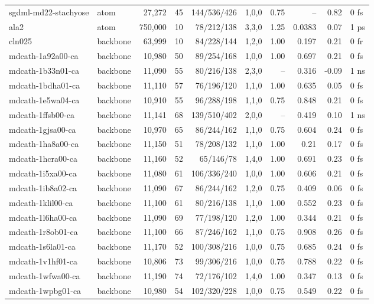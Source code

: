 \begin{small}
\begin{longtable}{llrrrlrrrl}
sgdml-md22-stachyose & atom & 27,272 & 45 & 144/536/426 & 1,0,0 & 0.75 & -- & 0.82 & 0 fs\\
ala2 & atom & 750,000 & 10 & 78/212/138 & 3,3,0 & 1.25 & 0.0383 & 0.07 & 1 ps\\
cln025 & backbone & 63,999 & 10 & 84/228/144 & 1,2,0 & 1.00 & 0.197 & 0.21 & 0 fr\\
mdcath-1a92a00-ca & backbone & 10,980 & 50 & 89/254/168 & 1,0,0 & 1.00 & 0.697 & 0.21 & 0 fs\\
mdcath-1b33n01-ca & backbone & 11,090 & 55 & 80/216/138 & 2,3,0 & -- & 0.316 & -0.09 & 1 ns\\
mdcath-1bdha01-ca & backbone & 11,110 & 57 & 76/196/120 & 1,1,0 & 1.00 & 0.635 & 0.05 & 0 fs\\
mdcath-1e5wa04-ca & backbone & 10,910 & 55 & 96/288/198 & 1,1,0 & 0.75 & 0.848 & 0.21 & 0 fs\\
mdcath-1ffsb00-ca & backbone & 11,141 & 68 & 139/510/402 & 2,0,0 & -- & 0.419 & 0.10 & 1 ns\\
mdcath-1gjsa00-ca & backbone & 10,970 & 65 & 86/244/162 & 1,1,0 & 0.75 & 0.604 & 0.24 & 0 fs\\
mdcath-1ha8a00-ca & backbone & 11,150 & 51 & 78/208/132 & 1,1,0 & 1.00 & 0.21 & 0.17 & 0 fs\\
mdcath-1hcra00-ca & backbone & 11,160 & 52 & 65/146/78 & 1,4,0 & 1.00 & 0.691 & 0.23 & 0 fs\\
mdcath-1i5xa00-ca & backbone & 11,080 & 61 & 106/336/240 & 1,0,0 & 1.00 & 0.606 & 0.21 & 0 fs\\
mdcath-1ib8a02-ca & backbone & 11,090 & 67 & 86/244/162 & 1,2,0 & 0.75 & 0.409 & 0.06 & 0 fs\\
mdcath-1klil00-ca & backbone & 11,100 & 61 & 80/216/138 & 1,1,0 & 1.00 & 0.552 & 0.23 & 0 fs\\
mdcath-1l6ha00-ca & backbone & 11,090 & 69 & 77/198/120 & 1,2,0 & 1.00 & 0.344 & 0.21 & 0 fs\\
mdcath-1r8ob01-ca & backbone & 11,100 & 66 & 87/246/162 & 1,1,0 & 0.75 & 0.908 & 0.26 & 0 fs\\
mdcath-1s6la01-ca & backbone & 11,170 & 52 & 100/308/216 & 1,0,0 & 0.75 & 0.685 & 0.24 & 0 fs\\
mdcath-1v1hf01-ca & backbone & 10,806 & 73 & 99/306/216 & 1,0,0 & 0.75 & 0.788 & 0.22 & 0 fs\\
mdcath-1wfwa00-ca & backbone & 11,190 & 74 & 72/176/102 & 1,4,0 & 1.00 & 0.347 & 0.13 & 0 fs\\
mdcath-1wpbg01-ca & backbone & 10,980 & 54 & 102/320/228 & 1,0,0 & 0.75 & 0.549 & 0.22 & 0 fs\\

\end{longtable}
\end{small}
